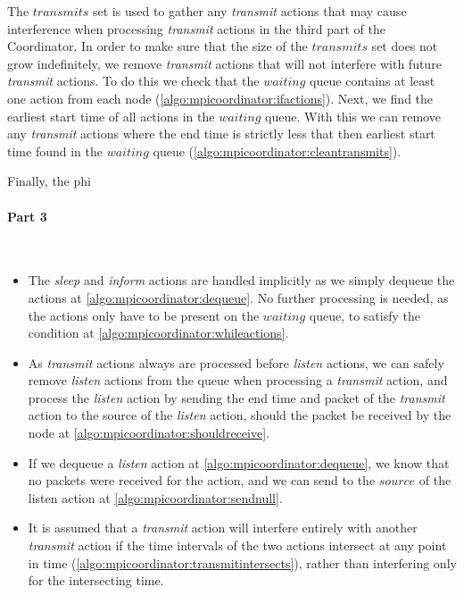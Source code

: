 The $\mathit{transmits}$ set is used to gather any \textit{transmit} actions that may cause interference when processing \textit{transmit} actions in the third part of the Coordinator. In order to make sure that the size of the $\mathit{transmits}$ set does not grow indefinitely, we remove \textit{transmit} actions that will not interfere with future \textit{transmit} actions. To do this we check that the $\mathit{waiting}$ queue contains at least one action from each node (\autoref{algo:mpicoordinator:ifactions}). Next, we find the earliest start time of all actions in the $\mathit{waiting}$ queue. With this we can remove any \textit{transmit} actions where the end time is strictly less that then earliest start time found in the $\mathit{waiting}$ queue (\autoref{algo:mpicoordinator:cleantransmits}). \smallbreak

Finally, the phi

\paragraph{Part 3} \

\begin{itemize}
    \item The \textit{sleep} and \textit{inform} actions are handled implicitly as we simply dequeue the actions at \autoref{algo:mpicoordinator:dequeue}. No further processing is needed, as the actions only have to be present on the $\mathit{waiting}$ queue, to satisfy the condition at \autoref{algo:mpicoordinator:whileactions}.
    \item As \textit{transmit} actions always are processed before \textit{listen} actions, we can safely remove \textit{listen} actions from the queue when processing a \textit{transmit} action, and process the \textit{listen} action by sending the end time and packet of the \textit{transmit} action to the source of the \textit{listen} action, should the packet be received by the node at \autoref{algo:mpicoordinator:shouldreceive}.
    \item If we dequeue a \textit{listen} action at \autoref{algo:mpicoordinator:dequeue}, we know that no packets were received for the action, and we can send \KwNull to the $\mathit{source}$ of the listen action at \autoref{algo:mpicoordinator:sendnull}.
    \item It is assumed that a \textit{transmit} action will interfere entirely with another \textit{transmit} action if the time intervals of the two actions intersect at any point in time (\autoref{algo:mpicoordinator:transmitintersects}), rather than interfering only for the intersecting time.
\end{itemize}

